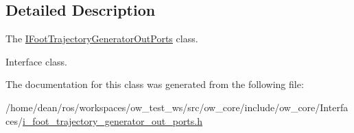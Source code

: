 \subsection{Detailed Description}
The \hyperlink{classow__core_1_1IFootTrajectoryGeneratorOutPorts}{I\+Foot\+Trajectory\+Generator\+Out\+Ports} class. 

Interface class. 

The documentation for this class was generated from the following file\+:\begin{DoxyCompactItemize}
\item 
/home/dean/ros/workspaces/ow\+\_\+test\+\_\+ws/src/ow\+\_\+core/include/ow\+\_\+core/\+Interfaces/\hyperlink{i__foot__trajectory__generator__out__ports_8h}{i\+\_\+foot\+\_\+trajectory\+\_\+generator\+\_\+out\+\_\+ports.\+h}\end{DoxyCompactItemize}
